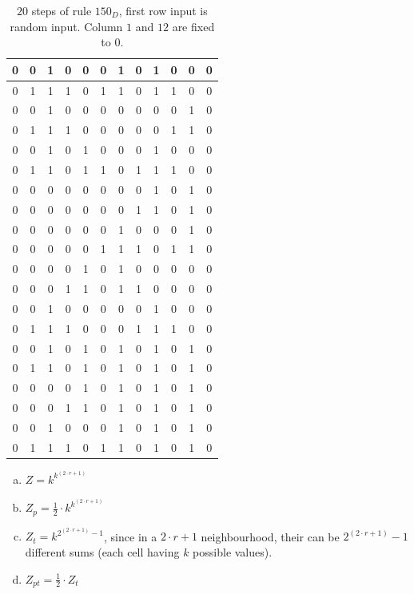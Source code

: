 \documentclass[10pt,a4paper,boxed]{hmcpset}
\begin{document}
\begin{solution}
\begin{table}[h!]
	\centering
	\begin{tabular}{|c|c|c|c|c|c|c|c|c|c|c|c|}
	\hline
		0	&0	&1	&0	&0	&0	&1	&0	&1	&0	&0	&0\\
	\hline
		0	&1	&1	&1	&0	&1	&1	&0	&1	&1	&0	&0\\
	\hline
		0	&0	&1	&0	&0	&0	&0	&0	&0	&0	&1	&0\\
	\hline
		0	&1	&1	&1	&0	&0	&0	&0	&0	&1	&1	&0\\
	\hline
		0	&0	&1	&0	&1	&0	&0	&0	&1	&0	&0	&0\\
	\hline
		0	&1	&1	&0	&1	&1	&0	&1	&1	&1	&0	&0\\
	\hline
		0	&0	&0	&0	&0	&0	&0	&0	&1	&0	&1	&0\\
	\hline
		0	&0	&0	&0	&0	&0	&0	&1	&1	&0	&1	&0\\
	\hline
		0	&0	&0	&0	&0	&0	&1	&0	&0	&0	&1	&0\\
	\hline
		0	&0	&0	&0	&0	&1	&1	&1	&0	&1	&1	&0\\
	\hline
		0	&0	&0	&0	&1	&0	&1	&0	&0	&0	&0	&0\\
	\hline
		0	&0	&0	&1	&1	&0	&1	&1	&0	&0	&0	&0\\
	\hline
		0	&0	&1	&0	&0	&0	&0	&0	&1	&0	&0	&0\\
	\hline
		0	&1	&1	&1	&0	&0	&0	&1	&1	&1	&0	&0\\
	\hline
		0	&0	&1	&0	&1	&0	&1	&0	&1	&0	&1	&0\\
	\hline
		0	&1	&1	&0	&1	&0	&1	&0	&1	&0	&1	&0\\
	\hline
		0	&0	&0	&0	&1	&0	&1	&0	&1	&0	&1	&0\\
	\hline
		0	&0	&0	&1	&1	&0	&1	&0	&1	&0	&1	&0\\
	\hline
		0	&0	&1	&0	&0	&0	&1	&0	&1	&0	&1	&0\\
	\hline
		0	&1	&1	&1	&0	&1	&1	&0	&1	&0	&1	&0\\
	\hline 
	\end{tabular} 
\caption{$20$ steps of rule ${150}_D$, first row input is random input. Column $1$ and $12$ are fixed to $0$.}
\label{tab:rule150}
\end{table}
\end{solution}

\begin{problem}[Assignment 13]
\end{problem}
\begin{solution}
	\begin{enumerate}[a)]
		\item $Z = k^{k^{(2 \cdot r+1)}}$
		\item $Z_p = \frac{1}{2} \cdot k^{k^{(2 \cdot r+1)}}$
		\item $Z_t = k^{2^{(2 \cdot r+1)}-1}$, since in a $2 \cdot r + 1$ neighbourhood, their can be $2^{(2 \cdot r+1)}-1$ different sums (each cell having $k$ possible values).
		\item $Z_{pt} = \frac{1}{2} \cdot Z_t$
	\end{enumerate}
\end{solution}
\end{document}
